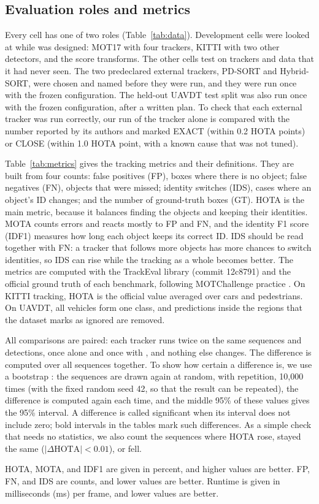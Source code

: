 \subsection{Evaluation roles and metrics}\label{sec:roles}
Every cell has one of two roles (Table~\ref{tab:data}). Development cells
were looked at while \scl{} was designed: MOT17 with four trackers, KITTI
with two other detectors, and the score transforms. The other cells test
\scl{} on trackers and data that it had never seen. The two predeclared
external trackers, PD-SORT and Hybrid-SORT, were chosen and named before they
were run, and they were run once with the frozen configuration. The held-out
UAVDT test split was also run once with the frozen configuration, after a
written plan. To check that each external tracker was run correctly, our run
of the tracker alone is compared with the number reported by its authors and
marked EXACT (within 0.2 HOTA points) or CLOSE (within 1.0 HOTA point, with a
known cause that was not tuned).

\label{sec:metrics}Table~\ref{tab:metrics} gives the tracking metrics and
their definitions. They are built from four counts: false positives (FP),
boxes where there is no object; false negatives (FN), objects that were
missed; identity switches (IDS), cases where an object's ID changes; and the
number of ground-truth boxes (GT). HOTA is the main metric, because it
balances finding the objects and keeping their identities. MOTA counts errors
and reacts mostly to FP and FN, and the identity F1 score (IDF1) measures how
long each object keeps its correct ID. IDS should be read together with FN: a
tracker that follows more objects has more chances to switch identities, so
IDS can rise while the tracking as a whole becomes better. The metrics are
computed with the TrackEval library (commit 12c8791) and the official ground
truth of each benchmark, following MOTChallenge practice
\cite{dendorfer2021motchallenge}. On KITTI tracking, HOTA is the official
value averaged over cars and pedestrians. On UAVDT, all vehicles form one
class, and predictions inside the regions that the dataset marks as ignored
are removed.



All comparisons are paired: each tracker runs twice on the same sequences and
detections, once alone and once with \scl{}, and nothing else changes. The
difference is computed over all sequences together. To show how
certain a difference is, we use a bootstrap \cite{efron1993bootstrap}: the
sequences are drawn again at random, with repetition, 10,000 times (with the
fixed random seed 42, so that the result can be repeated),
the difference is computed again each time, and the middle 95\% of these
values gives the 95\% interval. A difference is called significant when its
interval does not include zero; bold intervals in the tables mark such
differences. As a simple check that needs no statistics, we also count the
sequences where HOTA rose, stayed the same ($|\Delta\mathrm{HOTA}|<0.01$), or
fell.

HOTA, MOTA, and IDF1 are given in percent, and higher values are better. FP,
FN, and IDS are counts, and lower values are better. Runtime is given in
milliseconds (ms) per frame, and lower values are better.
